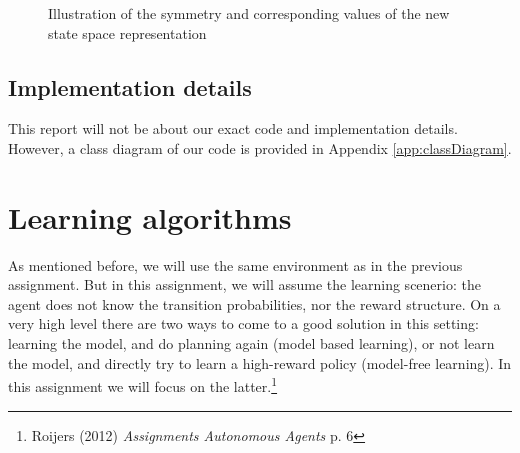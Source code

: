 \documentclass{article}
\begin{document}
\begin{figure}[ht]
\centering
{}
\caption{Illustration of the symmetry and corresponding values of the new state space representation}
\label{fig:statespaceIll}
\end{figure}


\subsection{Implementation details}
This report will not be about our exact code and implementation details. However, a class diagram of our code is provided in Appendix \ref{app:classDiagram}.

\section{Learning algorithms}
As mentioned before, we will use the same environment as in the previous assignment. But in this assignment, we will assume the learning scenerio: the agent does not know the transition probabilities, nor the reward structure. On a very high level there are two ways to come to a good solution in this setting: learning the model, and do planning again (model based learning), or not learn the model, and directly try to learn a high-reward policy (model-free learning). In this assignment we will focus on the latter.\footnote{Roijers (2012) \textit{Assignments Autonomous Agents} p. 6}
\end{document}
